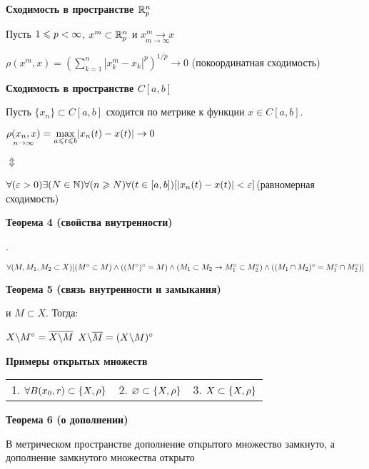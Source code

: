 \textbf{Сходимость в пространстве $\mathbb{R}^n_p$   }

Пусть $1 \leqslant  p < \infty $, ${x^m}\subset \mathbb{R}^n_p $ и $\underset{m \rightarrow \infty  }{x^m \rightarrow x}$

$\rho(x^m, x)= (\sum_{k = 1}^{n}|x^m_k-x_k|^p)^{1/p} \rightarrow 0$ (покоординатная сходимость)

\noindent\dotfill
    
\textbf{Сходимость в пространстве $C[a, b]$}

Пусть $\{ x_n \}\subset C[a, b]$ сходится по метрике к функции $x \in C[a, b]$.

$\underset{n \rightarrow \infty  }{\rho(x_n, x)}=\underset{a \leqslant  t \leqslant  b}{\max}|x_n(t)-x(t)| \rightarrow 0$

\hspace*{30mm}$\Updownarrow$

$\forall(\varepsilon>0)\exists(N\in \mathbb{N})\forall(n\geqslant N)\forall(t\in[a, b])
    [|x_n(t)-x(t)|<\varepsilon]$(равномерная сходимость)

    \noindent\dotfill
    
\textbf{Теорема 4 (свойства внутренности)}

\MS.

$\forall(M, M_1, M_2\subset X)[(M^{\circ} \subset M)
        \wedge((M^{\circ})^{\circ}=M)
        \wedge(M_1 \subset M_2 \rightarrow M_1^{\circ} \subset M_2^{\circ})
        \wedge \\((M_1 \cap M_2)^{\circ}=M_1^{\circ} \cap  M_2^{\circ})]$

        \noindent\dotfill
    
\textbf{Теорема 5 (связь внутренности и замыкания)}

\MS и $M \subset X$. Тогда:

$X\backslash M^{\circ}=\overline{X\backslash M}$ $X
    \backslash \overline M = (X \backslash M)^{\circ}$

    \noindent\dotfill
    
\textbf{Примеры открытых множеств  }

\begin{tabular}{c c c}
    1. $\forall B(x_0, r)\subset \{X, \rho\} $ &
    2. $\varnothing \subset \{X, \rho\} $      &
    3. $X \subset \{X, \rho\}$
\end{tabular}

\noindent\dotfill
    
\textbf{Теорема 6 (о дополнении)  }

В метрическом пространстве дополнение открытого множество замкнуто,
а дополнение замкнутого множества открыто

